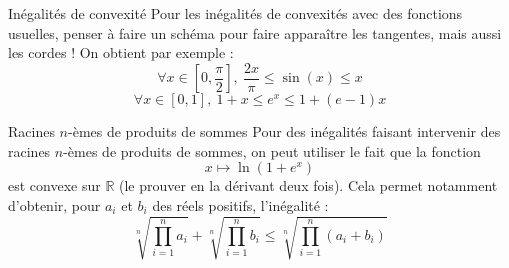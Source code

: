 \documentclass[french]{article}
\newcommand{\R}{\mathbb{R}}
\theoremstyle{definition}
\begin{document}
\begin{lem}{Inégalités de convexité} Pour les inégalités de convexités avec des fonctions usuelles, penser à faire un schéma pour faire apparaître les tangentes, mais aussi les cordes ! On obtient par exemple : $$\forall x\in\left[0,\frac{\pi}{2}\right],\ \frac{2x}{\pi}\leqslant \sin(x)\leqslant x$$
	$$\forall x\in[0,1],\ 1+x\leqslant e^x\leqslant1+(e-1)x$$
\end{lem}

\begin{lem}{Racines $n$-èmes de produits de sommes} Pour des inégalités faisant intervenir des racines $n$-èmes de produits de sommes, on peut utiliser le fait que la fonction $$x\mapsto\ln(1+e^x)$$ est convexe sur $\R$ (le prouver en la dérivant deux fois). Cela permet notamment d'obtenir, pour $a_i$ et $b_i$ des réels positifs, l'inégalité : $$\sqrt[n]{\prod_{i=1}^{n}a_i}+\sqrt[n]{\prod_{i=1}^{n}b_i}\leqslant\sqrt[n]{\prod_{i=1}^{n}(a_i+b_i)}$$
\end{lem}
\end{document}
